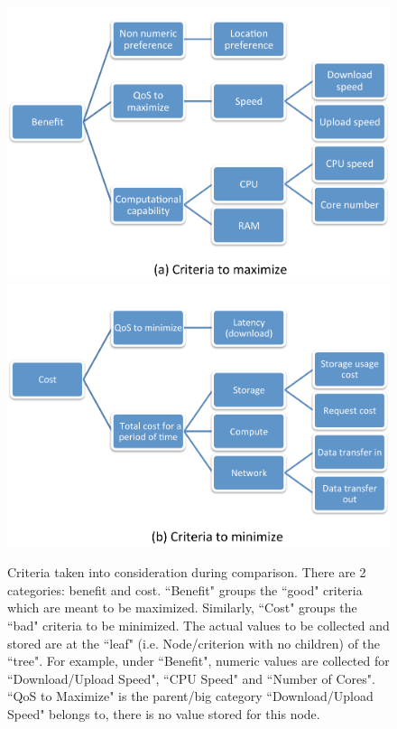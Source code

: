 \begin{figure}[ht]
 \centering
 \includegraphics[width=\textwidth,keepaspectratio]{Figures/AHP/figure4a.pdf}
  \includegraphics[width=\textwidth,keepaspectratio]{Figures/AHP/figure4b.pdf}
 \caption{ Criteria taken into consideration during comparison. There are 2 categories: benefit and cost. ``Benefit" groups the ``good" criteria which are meant to be maximized. Similarly, ``Cost" groups the ``bad" criteria to be minimized. The actual values to be collected and stored are at the ``leaf" (i.e. Node/criterion with no children) of the ``tree". For example, under ``Benefit", numeric values are collected for ``Download/Upload Speed", ``CPU Speed" and ``Number of Cores". ``QoS to Maximize" is the parent/big category ``Download/Upload Speed" belongs to, there is no value stored for this node.}
\label{fig4}
\end{figure}

